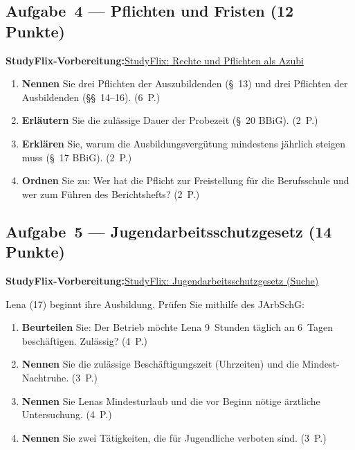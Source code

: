\documentclass[11pt, a4paper]{article}
\begin{document}
\subsection*{Aufgabe~4 --- Pflichten und Fristen (12 Punkte)}

\noindent\textbf{\color{bfwAccent}StudyFlix-Vorbereitung:}\enspace \href{https://studyflix.de/ausbildung/karriere-ausbildung/rechte-und-pflichten-als-azubi-4792}{StudyFlix: Rechte und Pflichten als Azubi}

\begin{enumerate}[label=(\alph*)]
  \item \textbf{Nennen} Sie drei Pflichten der Auszubildenden (\S~13) und drei Pflichten der Ausbildenden (\S\S~14--16). \hfill (6~P.)
  \item \textbf{Erläutern} Sie die zulässige Dauer der Probezeit (\S~20 BBiG). \hfill (2~P.)
  \item \textbf{Erklären} Sie, warum die Ausbildungsvergütung mindestens jährlich steigen muss (\S~17 BBiG). \hfill (2~P.)
  \item \textbf{Ordnen} Sie zu: Wer hat die Pflicht zur Freistellung für die Berufsschule und wer zum Führen des Berichtshefts? \hfill (2~P.)
\end{enumerate}

\subsection*{Aufgabe~5 --- Jugendarbeitsschutzgesetz (14 Punkte)}

\noindent\textbf{\color{bfwAccent}StudyFlix-Vorbereitung:}\enspace \href{https://studyflix.de/suche?q=Jugendarbeitsschutzgesetz}{StudyFlix: Jugendarbeitsschutzgesetz (Suche)}

\medskip
Lena (17) beginnt ihre Ausbildung. Prüfen Sie mithilfe des JArbSchG:

\begin{enumerate}[label=(\alph*)]
  \item \textbf{Beurteilen} Sie: Der Betrieb möchte Lena 9~Stunden täglich an 6~Tagen beschäftigen. Zulässig? \hfill (4~P.)
  \item \textbf{Nennen} Sie die zulässige Beschäftigungszeit (Uhrzeiten) und die Mindest-Nachtruhe. \hfill (3~P.)
  \item \textbf{Nennen} Sie Lenas Mindesturlaub und die vor Beginn nötige ärztliche Untersuchung. \hfill (4~P.)
  \item \textbf{Nennen} Sie zwei Tätigkeiten, die für Jugendliche verboten sind. \hfill (3~P.)
\end{enumerate}
\end{document}
